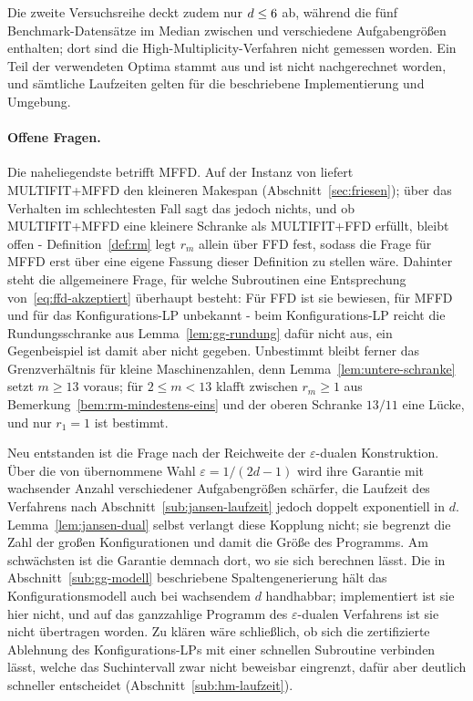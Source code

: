 Die zweite Versuchsreihe deckt zudem nur $d \le 6$ ab, während die fünf
Benchmark-Datensätze im Median zwischen \HmDBenchMedianMin{} und \HmDBenchMedianMax{}
verschiedene Aufgabengrößen enthalten; dort sind die High-Multiplicity-Verfahren nicht gemessen
worden.
Ein Teil der verwendeten Optima stammt aus \textcite{akram2025} und ist nicht nachgerechnet
worden, und sämtliche Laufzeiten gelten für die beschriebene Implementierung und Umgebung.

\paragraph{Offene Fragen.}
Die naheliegendste betrifft MFFD.
Auf der Instanz von \textcite{friesen1984} liefert MULTIFIT+MFFD den kleineren Makespan
(Abschnitt~\ref{sec:friesen}); über das Verhalten im schlechtesten Fall sagt das jedoch nichts,
und ob MULTIFIT+MFFD eine kleinere Schranke als MULTIFIT+FFD erfüllt, bleibt offen -
Definition~\ref{def:rm} legt $r_m$ allein über FFD fest, sodass die Frage für MFFD erst
über eine eigene Fassung dieser Definition zu stellen wäre.
Dahinter steht die allgemeinere Frage, für welche Subroutinen eine Entsprechung
von~\eqref{eq:ffd-akzeptiert} überhaupt besteht: Für FFD ist sie bewiesen, für MFFD und für das
Konfigurations-LP unbekannt - beim Konfigurations-LP reicht die Rundungsschranke aus
Lemma~\ref{lem:gg-rundung} dafür nicht aus, ein Gegenbeispiel ist damit aber nicht gegeben.
Unbestimmt bleibt ferner das Grenzverhältnis für kleine Maschinenzahlen, denn
Lemma~\ref{lem:untere-schranke} setzt $m \ge 13$ voraus; für $2 \le m < 13$ klafft zwischen
$r_m \ge 1$ aus Bemerkung~\ref{bem:rm-mindestens-eins} und der oberen Schranke $13/11$ eine
Lücke, und nur $r_1 = 1$ ist bestimmt.

Neu entstanden ist die Frage nach der Reichweite der $\varepsilon$-dualen Konstruktion.
Über die von \textcite{jansen_solisoba2010} übernommene Wahl $\varepsilon = 1/(2d-1)$ wird ihre
Garantie mit wachsender Anzahl verschiedener Aufgabengrößen schärfer, die Laufzeit des
Verfahrens nach Abschnitt~\ref{sub:jansen-laufzeit} jedoch doppelt exponentiell in $d$.
Lemma~\ref{lem:jansen-dual} selbst verlangt diese Kopplung nicht; sie begrenzt die Zahl der
großen Konfigurationen und damit die Größe des Programms.
Am schwächsten ist die Garantie demnach dort, wo sie sich berechnen lässt.
Die in Abschnitt~\ref{sub:gg-modell} beschriebene Spaltengenerierung hält das
Konfigurationsmodell auch bei wachsendem $d$ handhabbar; implementiert ist sie hier nicht, und
auf das ganzzahlige Programm des $\varepsilon$-dualen Verfahrens ist sie nicht übertragen
worden.
Zu klären wäre schließlich, ob sich die zertifizierte Ablehnung des Konfigurations-LPs mit einer
schnellen Subroutine verbinden lässt, welche das Suchintervall zwar nicht beweisbar eingrenzt,
dafür aber deutlich schneller entscheidet (Abschnitt~\ref{sub:hm-laufzeit}).
